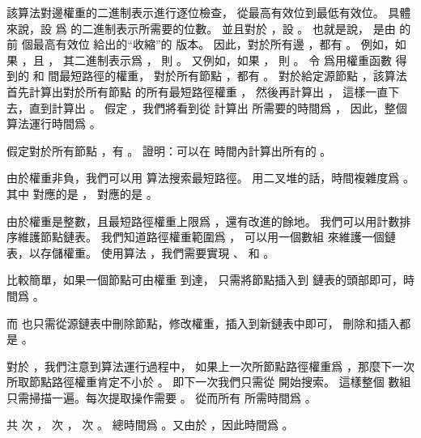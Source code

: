 該算法對邊權重的二進制表示進行逐位檢查，
從最高有效位到最低有效位。
具體來說，設  爲  的二進制表示所需要的位數。
並且對於 ，設 。
也就是說，  是由  的前  個最高有效位
給出的“收縮”的  版本。
因此，對於所有邊 ，都有 。
例如，如果 ，且 ，
其二進制表示爲 \m{\langle 11001\rangle}，
則 。
又例如，如果 ，
則 。
令  爲用權重函數  得到的  和  間最短路徑的權重，
對於所有節點 ，都有 。
對於給定源節點 ，該算法首先計算出對於所有節點  的所有最短路徑權重 ，
然後再計算出 ，
這樣一直下去，直到計算出 。
假定 ，我們將看到從  計算出  所需要的時間爲 ，
因此，整個算法運行時間爲 。

\startigBase[a]\startitem
假定對於所有節點 ，有 。
證明：可以在  時間內計算出所有的 。
\stopitem\stopigBase

\startANSWER
由於權重非負，我們可以用  算法搜索最短路徑。
用二叉堆的話，時間複雜度爲 。
其中  對應的是 ，
  對應的是 。

由於權重是整數，且最短路徑權重上限爲 ，還有改進的餘地。
我們可以用計數排序維護節點鏈表。
我們知道路徑權重範圍爲 \m{[0,|E|]}，
可以用一個數組  來維護一個鏈表，以存儲權重。
使用算法 ，我們需要實現 、  和 。

 比較簡單，如果一個節點可由權重  到達，
只需將節點插入到  鏈表的頭部即可，時間爲 。

而  也只需從源鏈表中刪除節點，修改權重，插入到新鏈表中即可，
刪除和插入都是 。

對於 ，我們注意到算法運行過程中，
如果上一次所節點路徑權重爲 ，那麼下一次所取節點路徑權重肯定不小於 。
即下一次我們只需從  開始搜索。
這樣整個  數組只需掃描一遍。每次提取操作需要 。
從而所有  所需時間爲 。

共  次 ，  次 ，  次 。
總時間爲 。又由於 ，因此時間爲 。
\stopANSWER

